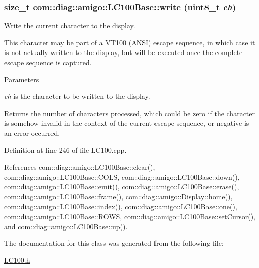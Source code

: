 \hypertarget{classcom_1_1diag_1_1amigo_1_1LC100Base_aa65643803194c15f83e0204d3523ec7e}{
\subsubsection[{write}]{\setlength{\rightskip}{0pt plus 5cm}size\_\-t com::diag::amigo::LC100Base::write (uint8\_\-t {\em ch})}}
\label{classcom_1_1diag_1_1amigo_1_1LC100Base_aa65643803194c15f83e0204d3523ec7e}


Write the current character to the display. 

This character may be part of a VT100 (ANSI) escape sequence, in which case it is not actually written to the display, but will be executed once the complete escape sequence is captured. 
\begin{DoxyParams}{Parameters}
\item[{\em ch}]is the character to be written to the display. \end{DoxyParams}
\begin{DoxyReturn}{Returns}
the number of characters processed, which could be zero if the character is somehow invalid in the context of the current escape sequence, or negative is an error occurred. 
\end{DoxyReturn}


Definition at line 246 of file LC100.cpp.



References com::diag::amigo::LC100Base::clear(), com::diag::amigo::LC100Base::COLS, com::diag::amigo::LC100Base::down(), com::diag::amigo::LC100Base::emit(), com::diag::amigo::LC100Base::erase(), com::diag::amigo::LC100Base::frame(), com::diag::amigo::Display::home(), com::diag::amigo::LC100Base::index(), com::diag::amigo::LC100Base::one(), com::diag::amigo::LC100Base::ROWS, com::diag::amigo::LC100Base::setCursor(), and com::diag::amigo::LC100Base::up().



The documentation for this class was generated from the following file:\begin{DoxyCompactItemize}
\item 
\hyperlink{LC100_8h}{LC100.h}\end{DoxyCompactItemize}

